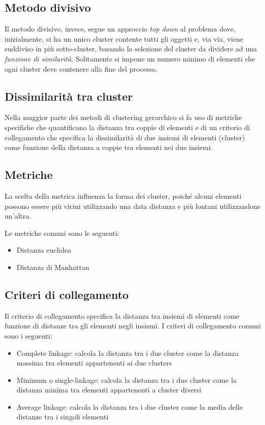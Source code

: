 	\subsection{Metodo divisivo}
		Il metodo divisivo, invece, segue un approccio \emph{top down} al problema dove, inizialmente, si ha un unico cluster contente tutti gli oggetti e, via via, viene suddiviso in più sotto-cluster, basando la selezione del cluster da dividere ad una \emph{funzione di similarità}. Solitamente si impone un numero minimo di elementi che ogni cluster deve contenere alla fine del processo. 

	\subsection{Dissimilarità tra cluster}
		Nella maggior parte dei metodi di clustering gerarchico si fa uso di metriche specifiche che quantificano la distanza tra coppie di elementi e di un criterio di collegamento che specifica la dissimilarità di due insiemi di elementi (cluster) come funzione della distanza a coppie tra elementi nei due insiemi.

	\subsection{Metriche}
		La scelta della metrica influenza la forma dei cluster, poiché alcuni elementi possono essere più vicini utilizzando una data distanza e più lontani utilizzandone un'altra.

		Le metriche comuni sono le seguenti:
		\begin{itemize}
		  	\item Distanza euclidea
		  	\item Distanza di Manhattan
		\end{itemize}

	\subsection{Criteri di collegamento}
		Il criterio di collegamento specifica la distanza tra insiemi di elementi come funzione di distanze tra gli elementi negli insiemi.
		I criteri di collegamento comuni sono i seguenti:
		\begin{itemize}
			\item Complete linkage: calcola la distanza tra i due cluster come la distanza massima tra elementi appartenenti ai due clusters
			\item Minimum o single-linkage: calcola la distanza tra i due cluster come la distanza minima tra elementi appartenenti a cluster diversi
			\item Average linkage: calcola la distanza tra i due cluster come la media delle distanze tra i singoli elementi
		\end{itemize}

